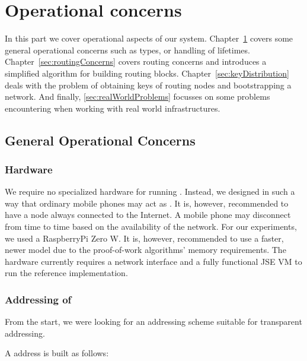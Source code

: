 \part{Operational concerns}\label{sec:operation}
In this part we cover operational aspects of our system. Chapter~\ref{sec:genOperationalConcerns} covers some general operational concerns such as \VortexNode{} types, or handling of lifetimes. Chapter~\ref{sec:routingConcerns} covers routing concerns and introduces a simplified algorithm for building routing blocks. Chapter~\ref{sec:keyDistribution} deals with the problem of obtaining keys of routing nodes and bootstrapping a network. And finally, \cref{sec:realWorldProblems} focusses on some problems encountering when working with real world infrastructures.

\chapter{General Operational Concerns}\label{sec:genOperationalConcerns}
\section{Hardware}
We require no specialized hardware for running \VortexNodes. Instead, we designed \MessageVortex{} in such a way that ordinary mobile phones may act as \VortexNodes. It is, however, recommended to have a node always connected to the Internet. A mobile phone may disconnect from time to time based on the availability of the network. For our experiments, we used a RaspberryPi Zero W. It is, however, recommended to use a faster, newer model due to the proof-of-work algorithms' memory requirements. The hardware currently requires a network interface and a fully functional JSE VM to run the reference implementation.

\section{Addressing of \VortexNodes}
From the start, we were looking for an addressing scheme suitable for transparent addressing.

A \MessageVortex{} address is built as follows: 

